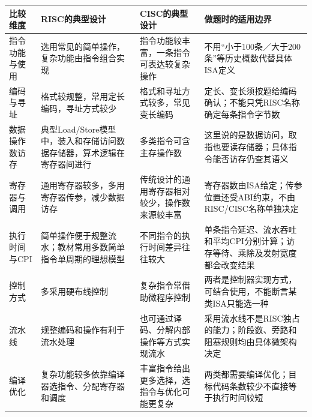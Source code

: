 \begin{wideblock}\par\medskip\noindent\begin{minipage}{\linewidth}\fontsize{9.3}{12}\selectfont\begin{tabularx}{\linewidth}{@{}YYYY@{}}
\toprule\noalign{}
\begin{minipage}[b]{\linewidth}\raggedright
比较维度
\end{minipage} & \begin{minipage}[b]{\linewidth}\raggedright
RISC的典型设计
\end{minipage} & \begin{minipage}[b]{\linewidth}\raggedright
CISC的典型设计
\end{minipage} & \begin{minipage}[b]{\linewidth}\raggedright
做题时的适用边界
\end{minipage} \\
\midrule\noalign{}


指令功能与使用 & 选用常见的简单操作，复杂功能由指令组合实现 & 指令功能较丰富，一条指令可表达较复杂操作 & 不用``小于100条／大于200条''等历史概数代替具体ISA定义 \\
编码与寻址 & 格式较规整，常用定长编码，寻址方式较少 & 格式和寻址方式较多，常见变长编码 & 定长、变长须按题给编码确认；不能只凭RISC名称确定每条指令字节数 \\
数据操作数访存 & 典型Load/Store模型中，装入和存储访问数据存储器，算术逻辑在寄存器间进行 & 多类指令可含主存操作数 & 这里说的是数据访问，取指也要读存储器；具体指令能否访存仍查其语义 \\
寄存器与调用 & 通用寄存器较多，多用寄存器传参，减少数据访存 & 传统设计的通用寄存器相对较少，操作数来源较丰富 & 寄存器数由ISA给定；传参位置还受ABI约束，不由RISC/CISC名称单独决定 \\
执行时间与CPI & 简单操作便于规整流水；教材常用多数简单指令单周期的理想模型 & 不同指令的执行时间差异往往较大 & 单条指令延迟、流水吞吐和平均CPI分别计算；访存等待、乘除及发射宽度都会改变结果 \\
控制方式 & 多采用硬布线控制 & 复杂指令常借助微程序控制 & 两者是控制器实现方式，可结合使用，不能断言某类ISA只能选一种 \\
流水线 & 规整编码和操作有利于流水处理 & 也可通过译码、分解内部操作等方式实现流水 & 采用流水线不是RISC独占的能力；阶段数、旁路和阻塞规则均由具体微架构决定 \\
编译优化 & 复杂功能较多依靠编译器选指令、分配寄存器和调度 & 丰富指令给出更多选择，选指令与优化可能更复杂 & 两类都需要编译优化；目标代码条数较少不直接等于执行时间较短 \\
\bottomrule\end{tabularx}
\end{minipage}\par\medskip\end{wideblock}

